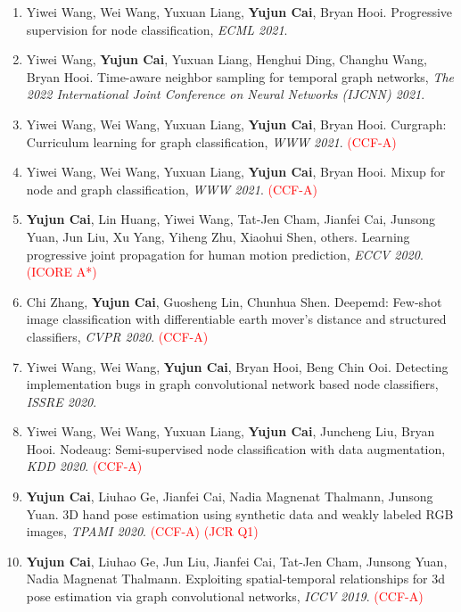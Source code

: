 \documentclass[11pt,letterpaper]{article}
\begin{document}
\begin{enumerate}
\item Yiwei Wang, Wei Wang, Yuxuan Liang, \textbf{Yujun Cai}, Bryan Hooi. Progressive supervision for node classification, \textit{ECML 2021}.

\item Yiwei Wang, \textbf{Yujun Cai}, Yuxuan Liang, Henghui Ding, Changhu Wang, Bryan Hooi. Time-aware neighbor sampling for temporal graph networks, \textit{The 2022 International Joint Conference on Neural Networks (IJCNN) 2021}.

\item Yiwei Wang, Wei Wang, Yuxuan Liang, \textbf{Yujun Cai}, Bryan Hooi. Curgraph: Curriculum learning for graph classification, \textit{WWW 2021}. \textcolor{red}{(CCF-A)}

\item Yiwei Wang, Wei Wang, Yuxuan Liang, \textbf{Yujun Cai}, Bryan Hooi. Mixup for node and graph classification, \textit{WWW 2021}. \textcolor{red}{(CCF-A)}

\item \textbf{Yujun Cai}, Lin Huang, Yiwei Wang, Tat-Jen Cham, Jianfei Cai, Junsong Yuan, Jun Liu, Xu Yang, Yiheng Zhu, Xiaohui Shen, others. Learning progressive joint propagation for human motion prediction, \textit{ECCV 2020}. \textcolor{red}{(ICORE A*)}

\item Chi Zhang, \textbf{Yujun Cai}, Guosheng Lin, Chunhua Shen. Deepemd: Few-shot image classification with differentiable earth mover's distance and structured classifiers, \textit{CVPR 2020}. \textcolor{red}{(CCF-A)}

\item Yiwei Wang, Wei Wang, \textbf{Yujun Cai}, Bryan Hooi, Beng Chin Ooi. Detecting implementation bugs in graph convolutional network based node classifiers, \textit{ISSRE 2020}.

\item Yiwei Wang, Wei Wang, Yuxuan Liang, \textbf{Yujun Cai}, Juncheng Liu, Bryan Hooi. Nodeaug: Semi-supervised node classification with data augmentation, \textit{KDD 2020}. \textcolor{red}{(CCF-A)}

\item \textbf{Yujun Cai}, Liuhao Ge, Jianfei Cai, Nadia Magnenat Thalmann, Junsong Yuan. 3D hand pose estimation using synthetic data and weakly labeled RGB images, \textit{TPAMI 2020}. \textcolor{red}{(CCF-A)} \textcolor{red}{(JCR Q1)}

\item \textbf{Yujun Cai}, Liuhao Ge, Jun Liu, Jianfei Cai, Tat-Jen Cham, Junsong Yuan, Nadia Magnenat Thalmann. Exploiting spatial-temporal relationships for 3d pose estimation via graph convolutional networks, \textit{ICCV 2019}. \textcolor{red}{(CCF-A)}


\end{enumerate}
\end{document}
